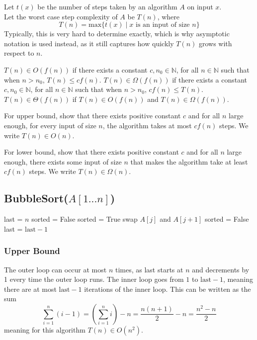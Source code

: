 Let $t(x)$ be the number of steps taken by an algorithm $A$ on input $x$. \\
Let the worst case step complexity of $A$ be $T(n)$, where
\[
T(n) = \text{max}\{ t(x) \mid x \text{ is an input of size } n \}
\]
Typically, this is very hard to determine exactly, which is why asymptotic notation is used instead, as it still captures how quickly $T(n)$ grows with respect to $n$. 

$T(n) \in O(f(n))$ if there exists a constant $c, n_0 \in \mathbb{N}$, for all $n \in \mathbb{N}$ such that when $n > n_0$, $T(n) \leq c f(n)$.
$T(n) \in \Omega(f(n))$ if there exists a constant $c, n_0 \in \mathbb{N}$, for all $n \in \mathbb{N}$ such that when $n > n_0$, $c f(n) \leq T(n)$.
$T(n) \in \Theta(f(n))$ if $T(n) \in O(f(n))$ and $T(n) \in \Omega(f(n))$.

For upper bound, show that there exists positive constant $c$ and for all $n$ large enough, for every input of size $n$, the algorithm takes at most $cf(n)$ steps. We write $T(n) \in O(n)$.

For lower bound, show that there exists positive constant $c$ and for all $n$ large enough, there exists some input of size $n$ that makes the algorithm take at least $cf(n)$ steps. We write $T(n) \in \Omega(n)$.

\newpage
\subsection*{BubbleSort($A[1...n]$)}
\begin{algorithmic}[1]
\State last = $n$ 
\State sorted = False
    \State sorted = True
            \State swap $A[j]$ and $A[j+1]$
            \State sorted = False
        \EndIf
    \EndFor
    \State last = $\text{last} - 1$
\EndWhile
\end{algorithmic}

\subsubsection*{Upper Bound}

The outer loop can occur at most $n$ times, as last starts at $n$ and decrements by 1 every time the outer loop runs. The inner loop goes from $1$ to $\text{last} - 1$, meaning there are at most $\text{last} - 1$ iterations of the inner loop. This can be written as the sum
\[
\sum_{i=1}^{n} (i-1) = \left(\sum_{i=1}^{n} i\right) - n = \frac{n(n+1)}{2} - n = \frac{n^2 - n}{2}
\]
meaning for this algorithm $T(n) \in O(n^2)$.

